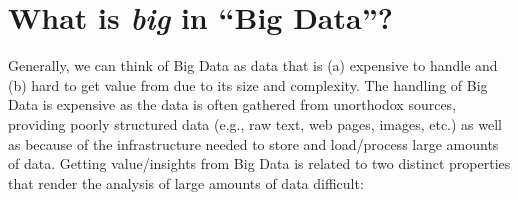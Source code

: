 \documentclass[
  12pt,
]{style/krantz}
\begin{document}
\hypertarget{what-is-big-in-big-data}{%
\section{\texorpdfstring{What is \emph{big} in ``Big Data''?}{What is big in ``Big Data''?}}\label{what-is-big-in-big-data}}

Generally, we can think of Big Data as data that is (a) expensive to handle and (b) hard to get value from due to its size and complexity. The handling of Big Data is expensive as the data is often gathered from unorthodox sources, providing poorly structured data (e.g., raw text, web pages, images, etc.) as well as because of the infrastructure needed to store and load/process large amounts of data. Getting value/insights from Big Data is related to two distinct properties that render the analysis of large amounts of data difficult:
\end{document}
